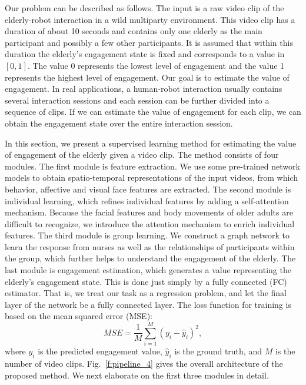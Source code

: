 \documentclass[VANCOUVER,STIX1COL]{WileyNJD-v2}
\begin{document}
Our problem can be described as follows. The input is a raw video clip of the elderly-robot interaction in a wild multiparty environment. This video clip has a duration of about 10 seconds and contains only one elderly as the main participant and possibly a few other participants. It is assumed that within this duration the elderly's engagement state is fixed and corresponds to a value in $[0, 1]$. The value 0 represents the lowest level of engagement and the value 1 represents the highest level of engagement. Our goal is to estimate the value of engagement. In real applications, a human-robot interaction usually contains several interaction sessions and each session can be further divided into a sequence of clips. If we can estimate the value of engagement for each clip, we can obtain the engagement state over the entire interaction session.

In this section, we present a supervised learning method for estimating the value of engagement of the elderly given a video clip. The method consists of four modules.
The first module is feature extraction. We use some pre-trained network models to obtain spatio-temporal representations of the input videos, from which behavior, affective and visual face features are extracted. The second module is individual learning, which refines individual features by adding a self-attention mechanism. Because the facial features and body movements of older adults are difficult to recognize, we introduce the attention mechanism to enrich individual features. The third module is group learning. We construct a graph network to learn the response from nurses as well as the relationships of participants within the group, which further helps to understand the engagement of the elderly. The last module is engagement estimation, which generates a value representing the elderly's engagement state. This is done just simply by a fully connected (FC) estimator. That is, we treat our task as a regression problem, and let the final layer of the network be a fully connected layer.
The loss function for training is based on the mean squared error (MSE):
\begin{equation}
  M\!S\!E = \frac{1}{M}\sum_{i=1}^M(y_i-\hat{y}_i)^2,
  \label{eq:mse}
\end{equation}
where $y_i$ is the predicted engagement value, $\hat{y}_i$ is the ground truth, and $M$ is the number of video clips. Fig.~\ref{f:pipeline_4} gives the overall architecture of the proposed method. We next elaborate on the first three modules in detail.
 
\end{document}
